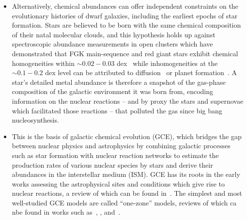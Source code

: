\documentclass[ms.tex]{subfiles}
\begin{document}
\begin{itemize}
	\item Alternatively, chemical abundances can offer independent constraints
	on the evolutionary histories of dwarf galaxies, including the earliest
	epochs of star formation.
	Stars are believed to be born with the same chemical composition of their
	natal molecular clouds, and this hypothesis holds up against spectroscopic
	abundance measurements in open clusters which have demonstrated that FGK
	main-sequence and red giant stars exhibit chemical homogeneities within
	$\sim0.02 - 0.03$ dex~\citep{DeSilva2006, Liu2016b, Bovy2016,
	Casamiquela2020} while inhomogeneities at the~$\sim0.1 - 0.2$ dex level can
	be attributed to diffusion~\citep{BertelliMotta2018, Souto2019, Liu2019}
	or planet formation~\citep{Melendez2009, Liu2016a, Spina2018}.
	A star's detailed metal abundance is therefore a snapshot of the gas-phase
	composition of the galactic environment it was born from, encoding
	information on the nuclear reactions -- and by proxy the stars and
	supernovae which facilitated those reactions -- that polluted the gas since
	big bang nucleosynthesis.

	\item This is the basis of galactic chemical evolution (GCE), which bridges
	the gap between nuclear physics and astrophysics by combining galactic
	processes such as star formation with nuclear reaction networks to estimate
	the production rates of various nuclear species by stars and derive their
	abundances in the interstellar medium (ISM).
	GCE has its roots in the early works assessing the astrophysical sites and
	conditions which give rise to nuclear reactions, a review of which can be
	found in~\citet[][the famous ``B2FH'' paper]{Burbidge1957}.
	The simplest and most well-studied GCE models are called ``one-zone''
	models, reviews of which ca nbe found in works such as~\citet{Tinsley1980},
	\citet{Pagel2009}, and~\citet{Matteucci2012, Matteucci2021}.



\end{itemize}
\end{document}
